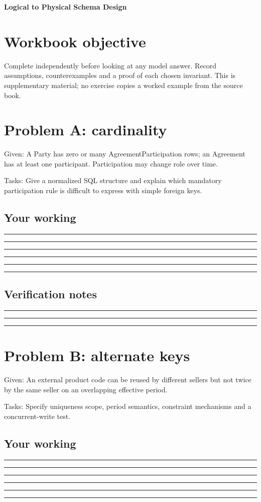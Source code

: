 \documentclass[11pt,letterpaper]{article}
\newcommand{\ResponseLine}{\par\vspace{1.05em}\noindent\rule{\linewidth}{0.4pt}\par}
\newcommand{\ResponseArea}{\ResponseLine\ResponseLine\ResponseLine}
\begin{document}
\begin{center}
{\LARGE\bfseries\color{navy} Logical to Physical Schema Design}\par
\vspace{0.25em}{\large Guided workbook | conceptual and operational analysis}\par
{}
\end{center}
\vspace{0.8em}
\section{Workbook objective}
Complete independently before looking at any model answer. Record assumptions, counterexamples and a proof of each chosen invariant. This is supplementary material; no exercise copies a worked example from the source book.


\section{Problem A: cardinality}
Given: A Party has zero or many AgreementParticipation rows; an Agreement has at least one participant. Participation may change role over time.

Tasks: Give a normalized SQL structure and explain which mandatory participation rule is difficult to express with simple foreign keys.

\subsection{Your working}
\ResponseArea\ResponseArea
\subsection{Verification notes}
\ResponseArea

\section{Problem B: alternate keys}
Given: An external product code can be reused by different sellers but not twice by the same seller on an overlapping effective period.

Tasks: Specify uniqueness scope, period semantics, constraint mechanisms and a concurrent-write test.

\subsection{Your working}
\ResponseArea\ResponseArea
\end{document}
